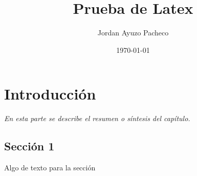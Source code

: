 \documentclass[]{book}
\title{\bf Prueba de Latex}
\author{Jordan Ayuzo Pacheco}
\date{\today}
\begin{document}
\frontmatter
\maketitle
\tableofcontents
\mainmatter
\chapter{Introducción}
\begin{center}
\textit{En esta parte se describe el resumen o síntesis
del capítulo.}
\end{center}
\section{Sección 1}
Algo de texto para la sección
\end{document}
